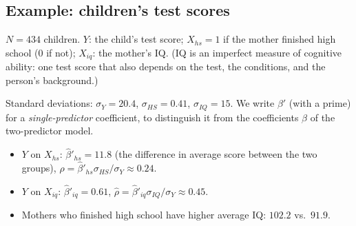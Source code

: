 \documentclass[11pt]{article}
\begin{document}
\subsection{Example: children's test scores}
$N=434$ children. $Y$: the child's test score; $X_{hs}=1$ if the mother finished high school ($0$ if not); $X_{iq}$: the mother's IQ.
(IQ is an imperfect measure of cognitive ability: one test score that also depends on the test, the conditions, and the person's background.)

Standard deviations: $\sigma_Y=20.4$, $\sigma_{HS}=0.41$, $\sigma_{IQ}=15$. We write $\beta'$ (with a prime) for a \emph{single-predictor}
coefficient, to distinguish it from the coefficients $\beta$ of the two-predictor model.
\begin{itemize}[leftmargin=*,itemsep=2pt]
\item $Y$ on $X_{hs}$: $\hat\beta'_{hs}=11.8$ (the difference in average score between the two groups), $\hat\rho=\hat\beta'_{hs}\sigma_{HS}/\sigma_Y\approx0.24$.
\item $Y$ on $X_{iq}$: $\hat\beta'_{iq}=0.61$, $\hat\rho=\hat\beta'_{iq}\sigma_{IQ}/\sigma_Y\approx0.45$.
\item Mothers who finished high school have higher average IQ: $102.2$ vs.\ $91.9$.
\end{itemize}
\end{document}
